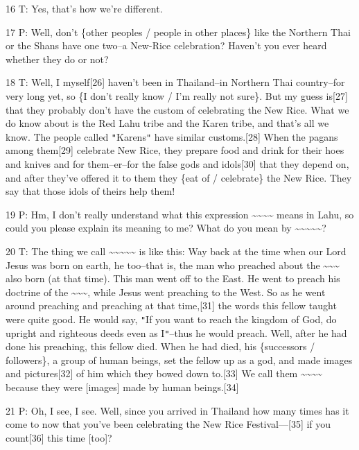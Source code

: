 {16 T: Yes, that's how we're different. }

{17 P: Well, don't \{other peoples / people in other places\} like the Northern
Thai or the Shans have one two--a New-Rice celebration? Haven't you ever heard
whether they do or not? }

{18 T: Well, I myself[26] haven't been in Thailand--in Northern Thai country--for
very long yet, so \{I don't really know / I'm really not sure\}. But my guess is[27]
that they probably don't have the custom of celebrating the New Rice. What we do
know about is the Red Lahu tribe and the Karen tribe, and that's all we know. The
people called \texttt{"}Karens\texttt{"} have similar customs.[28] When the pagans
among them[29] celebrate New Rice, they prepare food and drink for their hoes and
knives and for them--er--for the false gods and idols[30] that they depend on,
and after they've offered it to them they \{eat of / celebrate\} the New Rice.
They say that those idols of theirs help them! }

{19 P: Hm, I don't really understand what this expression }{\textbf{\textasciitilde{}\textasciitilde{}\textasciitilde{}\textasciitilde{}}}{
means in Lahu, so could you please explain its meaning to me? What do you mean
by \textasciitilde{}\textasciitilde{}\textasciitilde{}\textasciitilde{}\textasciitilde{}?
}

{20 T: The thing we call \textasciitilde{}\textasciitilde{}\textasciitilde{}\textasciitilde{}\textasciitilde{}
is like this: Way back at the time when our Lord Jesus was born on earth, he too--that
is, the man who preached about the \textasciitilde{}\textasciitilde{}\textasciitilde{}
also born (at that time). This man went off to the East. He went to preach his
doctrine of the \textasciitilde{}\textasciitilde{}\textasciitilde{}, while Jesus
went preaching to the West. So as he went around preaching and preaching at that
time,[31] the words this fellow taught were quite good. He would say, \texttt{"}If
you want to reach the kingdom of God, do upright and righteous deeds even as I\texttt{"}--thus
he would preach. Well, after he had done his preaching, this fellow died. When
he had died, his \{successors / followers\}, a group of human beings, set the fellow
up as a god, and made images and pictures[32] of him which they bowed down to.[33]
We call them \textasciitilde{}\textasciitilde{}\textasciitilde{}\textasciitilde{}
because they were [images] made by human beings.[34]}

{21 P: Oh, I see, I see. Well, since you arrived in Thailand how many times
has it come to now that you've been celebrating the New Rice Festival---[35] if
you count[36] this time [too]?}

